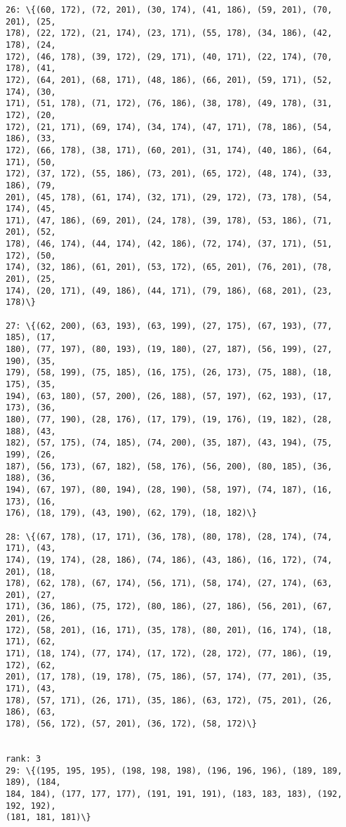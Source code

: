 \documentclass[11pt]{article}
\begin{document}
\begin{Verbatim}[commandchars=\\\{\}]
26: \{(60, 172), (72, 201), (30, 174), (41, 186), (59, 201), (70, 201), (25,
178), (22, 172), (21, 174), (23, 171), (55, 178), (34, 186), (42, 178), (24,
172), (46, 178), (39, 172), (29, 171), (40, 171), (22, 174), (70, 178), (41,
172), (64, 201), (68, 171), (48, 186), (66, 201), (59, 171), (52, 174), (30,
171), (51, 178), (71, 172), (76, 186), (38, 178), (49, 178), (31, 172), (20,
172), (21, 171), (69, 174), (34, 174), (47, 171), (78, 186), (54, 186), (33,
172), (66, 178), (38, 171), (60, 201), (31, 174), (40, 186), (64, 171), (50,
172), (37, 172), (55, 186), (73, 201), (65, 172), (48, 174), (33, 186), (79,
201), (45, 178), (61, 174), (32, 171), (29, 172), (73, 178), (54, 174), (45,
171), (47, 186), (69, 201), (24, 178), (39, 178), (53, 186), (71, 201), (52,
178), (46, 174), (44, 174), (42, 186), (72, 174), (37, 171), (51, 172), (50,
174), (32, 186), (61, 201), (53, 172), (65, 201), (76, 201), (78, 201), (25,
174), (20, 171), (49, 186), (44, 171), (79, 186), (68, 201), (23, 178)\}

27: \{(62, 200), (63, 193), (63, 199), (27, 175), (67, 193), (77, 185), (17,
180), (77, 197), (80, 193), (19, 180), (27, 187), (56, 199), (27, 190), (35,
179), (58, 199), (75, 185), (16, 175), (26, 173), (75, 188), (18, 175), (35,
194), (63, 180), (57, 200), (26, 188), (57, 197), (62, 193), (17, 173), (36,
180), (77, 190), (28, 176), (17, 179), (19, 176), (19, 182), (28, 188), (43,
182), (57, 175), (74, 185), (74, 200), (35, 187), (43, 194), (75, 199), (26,
187), (56, 173), (67, 182), (58, 176), (56, 200), (80, 185), (36, 188), (36,
194), (67, 197), (80, 194), (28, 190), (58, 197), (74, 187), (16, 173), (16,
176), (18, 179), (43, 190), (62, 179), (18, 182)\}

28: \{(67, 178), (17, 171), (36, 178), (80, 178), (28, 174), (74, 171), (43,
174), (19, 174), (28, 186), (74, 186), (43, 186), (16, 172), (74, 201), (18,
178), (62, 178), (67, 174), (56, 171), (58, 174), (27, 174), (63, 201), (27,
171), (36, 186), (75, 172), (80, 186), (27, 186), (56, 201), (67, 201), (26,
172), (58, 201), (16, 171), (35, 178), (80, 201), (16, 174), (18, 171), (62,
171), (18, 174), (77, 174), (17, 172), (28, 172), (77, 186), (19, 172), (62,
201), (17, 178), (19, 178), (75, 186), (57, 174), (77, 201), (35, 171), (43,
178), (57, 171), (26, 171), (35, 186), (63, 172), (75, 201), (26, 186), (63,
178), (56, 172), (57, 201), (36, 172), (58, 172)\}


rank: 3
29: \{(195, 195, 195), (198, 198, 198), (196, 196, 196), (189, 189, 189), (184,
184, 184), (177, 177, 177), (191, 191, 191), (183, 183, 183), (192, 192, 192),
(181, 181, 181)\}


\end{Verbatim}
\end{document}
